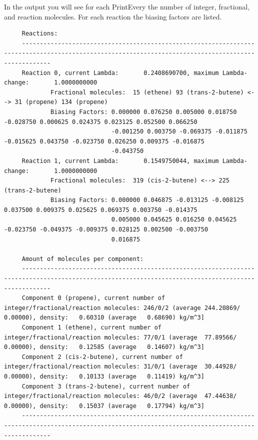 In the output you will see for each PrintEvery the number of integer, fractional, and reaction molecules.
For each reaction the biasing factors are listed.
\begin{tiny}
\begin{verbatim}
     Reactions:
     ----------------------------------------------------------------------------------------------------------------------------------------------------
     Reaction 0, current Lambda:       0.2408690700, maximum Lambda-change:       1.0000000000
             Fractional molecules:  15 (ethene) 93 (trans-2-butene) <--> 31 (propene) 134 (propene)
             Biasing Factors: 0.000000 0.076250 0.005000 0.018750 -0.028750 0.000625 0.024375 0.023125 0.052500 0.066250
                              -0.001250 0.003750 -0.069375 -0.011875 -0.015625 0.043750 -0.023750 0.026250 0.009375 -0.016875
                              -0.043750
     Reaction 1, current Lambda:       0.1549750044, maximum Lambda-change:       1.0000000000
             Fractional molecules:  319 (cis-2-butene) <--> 225 (trans-2-butene)
             Biasing Factors: 0.000000 0.046875 -0.013125 -0.008125 0.037500 0.009375 0.025625 0.069375 0.003750 -0.014375
                              0.005000 0.045625 0.016250 0.045625 -0.023750 -0.049375 -0.009375 0.028125 0.002500 -0.003750
                              0.016875
     
     Amount of molecules per component:
     ----------------------------------------------------------------------------------------------------------------------------------------------------
     Component 0 (propene), current number of integer/fractional/reaction molecules: 246/0/2 (average 244.20869/  0.00000), density:   0.60310 (average   0.68690) kg/m^3]
     Component 1 (ethene), current number of integer/fractional/reaction molecules: 77/0/1 (average  77.89566/  0.00000), density:   0.12585 (average   0.14607) kg/m^3]
     Component 2 (cis-2-butene), current number of integer/fractional/reaction molecules: 31/0/1 (average  30.44928/  0.00000), density:   0.10133 (average   0.11419) kg/m^3]
     Component 3 (trans-2-butene), current number of integer/fractional/reaction molecules: 46/0/2 (average  47.44638/  0.00000), density:   0.15037 (average   0.17794) kg/m^3]
     ----------------------------------------------------------------------------------------------------------------------------------------------------
\end{verbatim}
\end{tiny}

